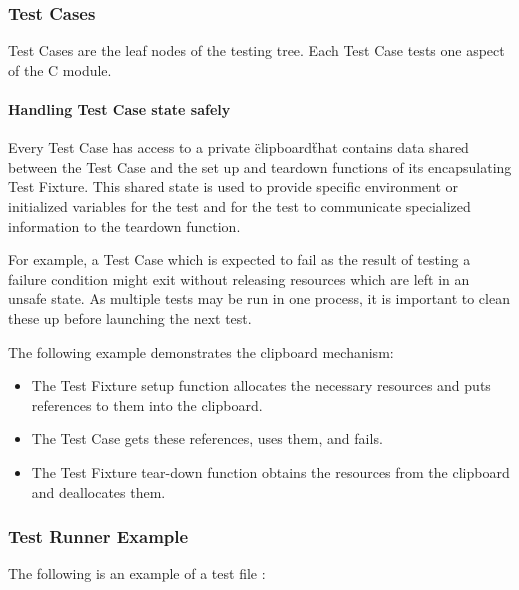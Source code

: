 \documentclass[12pt]{article} %
\begin{document}
\subsubsection{Test Cases}
Test Cases are the leaf nodes of the testing tree.  Each Test Case tests one aspect of the C module.

\paragraph {Handling Test Case state safely}

Every Test Case has access to a private \"clipboard\" that contains data shared between the Test Case and the set up and teardown functions of its encapsulating Test Fixture. This shared state is used to provide specific environment or initialized variables for the test and for the test to communicate specialized information to the teardown function.

For example, a Test Case which is expected to fail as the result of testing a failure condition might exit without releasing resources which are left in an unsafe state. As multiple tests may be run in one process, it is important to clean these up before launching the next test.

The following example demonstrates the clipboard mechanism: 
\begin{itemize}
\item{The Test Fixture setup function allocates the necessary resources and puts references to them into the clipboard.}
\item{The Test Case gets these references, uses them, and fails.} 
\item{The Test Fixture tear-down function obtains the resources from the clipboard and deallocates them.}
\end{itemize}

\subsubsection {Test Runner Example}
\noindent  The following is an example of a test file :
\end{document}
